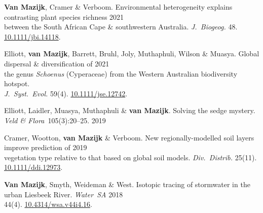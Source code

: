 \textbf{Van Mazijk}, Cramer \& Verboom.
Environmental heterogeneity explains contrasting plant species richness
                                                                  \hfill 2021 \\
\hspace{2em}
  between the South African Cape \& southwestern Australia.
  \textit{J.~Biogeog.}
  48. \href{https://doi.org/10.1111/jbi.14118}{10.1111/jbi.14118}.

Elliott, \textbf{van Mazijk}, Barrett, Bruhl,
Joly, Muthaphuli, Wilson \& Muasya.
Global dispersal \& diversification of                            \hfill 2021 \\
\hspace{2em}
  the genus \textit{Schoenus} (Cyperaceae)
  from the Western Australian biodiversity hotspot.                           \\
\hspace{2em}
  \textit{J.~Syst.~Evol.}
  59(4).
  \href{https://doi.org/10.1111/jse.1274}{10.1111/jse.12742}.

Elliott, Laidler, Muasya, Muthaphuli \& \textbf{van Mazijk}.
Solving the sedge mystery.
\textit{Veld \& Flora}~105(3):20--25.                             \hfill 2019

Cramer, Wootton, \textbf{van Mazijk} \& Verboom.
New regionally-modelled soil layers improve prediction of         \hfill 2019 \\
\hspace{2em}
  vegetation type relative to that based on global soil models.
  \textit{Div.~Distrib.}
  25(11).                                                        
  \href{https://doi.org/10.1111/ddi.12973}{10.1111/ddi.12973}.

\textbf{Van Mazijk}, Smyth, Weideman \& West.
Isotopic tracing of stormwater in the urban Liesbeek River.
\textit{Water~SA}                                                 \hfill 2018 \\
\hspace{2em}
  44(4).
  \href{https://doi.org/10.4314/wsa.v44i4.16}{10.4314/wsa.v44i4.16}.
